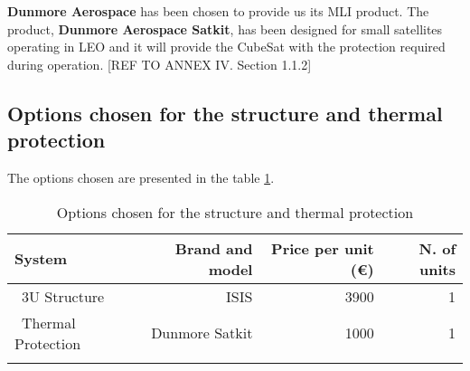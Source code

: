 \textbf{Dunmore Aerospace} has been chosen to provide us its MLI product. The product, \textbf{Dunmore Aerospace Satkit}, has been designed for small satellites operating in LEO and it will provide the CubeSat with the protection required during operation. [{REF TO ANNEX IV. Section 1.1.2}]

\subsection{Options chosen for the structure and thermal protection}
The options chosen are presented in the table \ref{structurefinal}.

\begin{longtable}{| l | r | r | r | }
\hline
\rowcolor[gray]{0.80}	\textbf{System} &  \textbf{Brand and model}     & \textbf{Price per unit (\euro)} & \textbf{N. of units}  \\
\hline
\endfirsthead

	   ~3U Structure & ISIS & 3900 & 1 \\
	   \hline
	   ~Thermal Protection & Dunmore Satkit & 1000 & 1\\
	\hline

\caption{Options chosen for the structure and thermal protection}
\label{structurefinal}
\end{longtable}